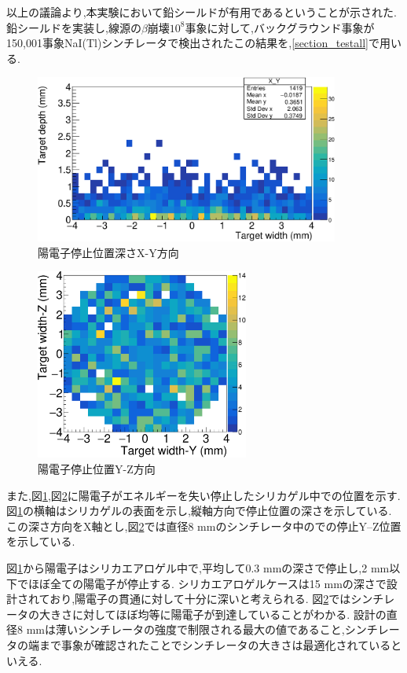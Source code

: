 以上の議論より,本実験において鉛シールドが有用であるということが示された.
鉛シールドを実装し,線源の$\beta$崩壊$10^8$事象に対して,バックグラウンド事象が150,001事象NaI(Tl)シンチレータで検出されたこの結果を,\ref{section_testall}で用いる.

\begin{figure}[!tbp]
	\centering
		\includegraphics[width=10cm]{fig/test2bXY.pdf}
	\caption{陽電子停止位置深さX-Y方向}
	\label{test2bXY}
\end{figure}

\begin{figure}[!tbp]
	\centering
		\includegraphics[width=7cm]{fig/test2bYZ.pdf}
	\caption{陽電子停止位置Y-Z方向}
	\label{test2bYZ}
\end{figure}




また,図\ref{test2bXY},図\ref{test2bYZ}に陽電子がエネルギーを失い停止したシリカゲル中での位置を示す.
図\ref{test2bXY}の横軸はシリカゲルの表面を示し,縦軸方向で停止位置の深さを示している.
この深さ方向をX軸とし,図\ref{test2bYZ}では直径8 mmのシンチレータ中のでの停止Y--Z位置を示している.

図\ref{test2bXY}から陽電子はシリカエアロゲル中で,平均して0.3 mmの深さで停止し,2 mm以下でほぼ全ての陽電子が停止する.
シリカエアロゲルケースは15 mmの深さで設計されており,陽電子の貫通に対して十分に深いと考えられる.
図\ref{test2bYZ}ではシンチレータの大きさに対してほぼ均等に陽電子が到達していることがわかる.
設計の直径8 mmは薄いシンチレータの強度で制限される最大の値であること,シンチレータの端まで事象が確認されたことでシンチレータの大きさは最適化されているといえる.


